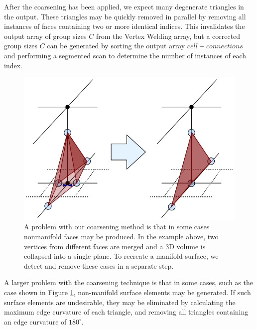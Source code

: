 \documentclass[10pt,journal,cspaper,compsoc]{IEEEtran}
\begin{document}
After the coarsening has been applied, we expect many degenerate triangles in the output. These triangles may be quickly removed in parallel by removing
all instances of faces containing two or more identical indices. This invalidates the output array of group sizes $C$ from the Vertex Welding array, but a corrected group sizes $C$ can be generated by sorting the output array $cell-connections$ and performing a segmented scan to determine the number of instances of each index.

\begin{figure}[!tb]
\includegraphics[width=\columnwidth]{Nonmanifold.pdf}
\caption{A problem with our coarsening method is that in some cases nonmanifold faces may be produced. In the example above, two vertices from different faces are merged and a 3D volume is collapsed into a single plane. To recreate a manifold surface, we detect and remove these cases in a separate step.}
\label{fig:Nonmanifold}
\end{figure}

A larger problem with the coarsening technique is that in some cases, such as the case shown in Figure \ref{fig:Nonmanifold}, non-manifold surface elements may be generated. If such surface elements are undesirable, they may be eliminated by calculating the maximum edge curvature of each triangle, and removing all triangles containing an edge curvature of $180^{\circ}$.
\end{document}
